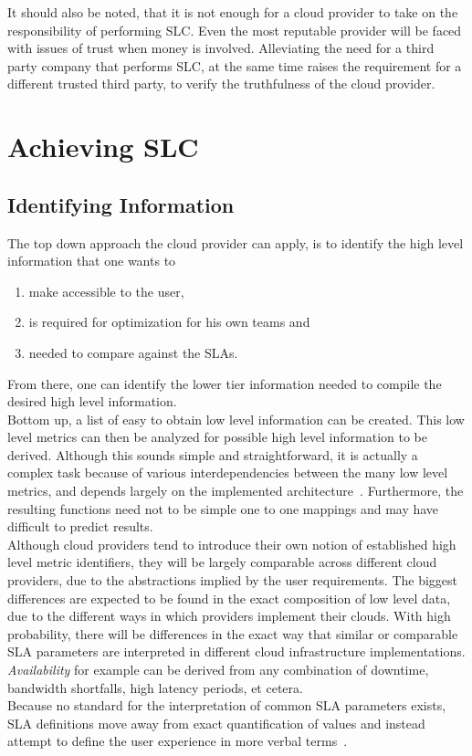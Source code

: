 \documentclass[a4paper]{llncs}
\begin{document}
It should also be noted, that it is not enough for a cloud provider to take on the responsibility of performing SLC. Even the most reputable provider will be faced with issues of trust when money is involved. Alleviating the need for a third party company that performs SLC, at the same time raises the requirement for a different trusted third party, to verify the truthfulness of the cloud provider.\\

\section{Achieving SLC}
\label{sec:achieving_slc}
\subsection{Identifying Information}
The top down approach the cloud provider can apply, is to identify the high level information that one wants to
\begin{enumerate}
	\item make accessible to the user,
	\item is required for optimization for his own teams and
	\item needed to compare against the SLAs.
\end{enumerate}

From there, one can identify the lower tier information needed to compile the desired high level information.\\

Bottom up, a list of easy to obtain low level information can be created. This low level metrics can then be analyzed for possible high level information to be derived.
Although this sounds simple and straightforward, it is actually a complex task because of various interdependencies between the many low level metrics, and depends largely on the implemented architecture~\cite{Undheim11}. Furthermore, the resulting functions need not to be simple one to one mappings and may have difficult to predict results.\\

Although cloud providers tend to introduce their own notion of established high level metric identifiers, they will be largely comparable across different cloud providers, due to the abstractions implied by the user requirements. The biggest differences are expected to be found in the exact composition of low level data, due to the different ways in which providers implement their clouds. With high probability, there will be differences in the exact way that similar or comparable SLA parameters are interpreted in different cloud infrastructure implementations. \textit{Availability} for example can be derived from any combination of downtime, bandwidth shortfalls, high latency periods, et cetera. \\
Because no standard for the interpretation of common SLA parameters exists, SLA definitions move away from exact quantification of values and instead attempt to define the user experience in more verbal terms~\cite{Roxburgh11}.
\end{document}
